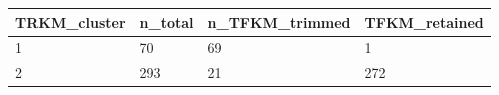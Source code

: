 \begin{tabular}{llll}
\toprule
TRKM\_cluster & n\_total & n\_TFKM\_trimmed & TFKM\_retained \\
\midrule
1 & 70 & 69 & 1 \\
2 & 293 & 21 & 272 \\
\bottomrule
\end{tabular}
